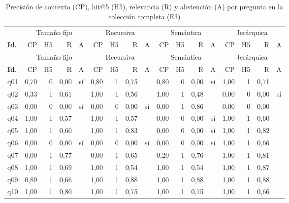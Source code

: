 \clearpage
\begin{scriptsize}
\setlength{\tabcolsep}{2.2pt}\renewcommand{\arraystretch}{0.92}
\begin{longtable}{@{}l rrrc rrrc rrrc rrrc@{}}
\caption[Precisión, hit@5, relevancia y abstención por pregunta (E3)]{Precisión de contexto (CP), hit@5 (H5), relevancia (R) y abstención (A) por pregunta en la colección completa (E3)}\label{tab:ap-e3-detalle}\\
\toprule
& \multicolumn{4}{c}{Tamaño fijo} & \multicolumn{4}{c}{Recursiva} & \multicolumn{4}{c}{Semántica} & \multicolumn{4}{c}{Jerárquica} \\
\cmidrule(lr){2-5}\cmidrule(lr){6-9}\cmidrule(lr){10-13}\cmidrule(lr){14-17}
\textbf{Id.} & CP & H5 & R & A & CP & H5 & R & A & CP & H5 & R & A & CP & H5 & R & A \\
\midrule
\endfirsthead
\toprule
& \multicolumn{4}{c}{Tamaño fijo} & \multicolumn{4}{c}{Recursiva} & \multicolumn{4}{c}{Semántica} & \multicolumn{4}{c}{Jerárquica} \\
\cmidrule(lr){2-5}\cmidrule(lr){6-9}\cmidrule(lr){10-13}\cmidrule(lr){14-17}
\textbf{Id.} & CP & H5 & R & A & CP & H5 & R & A & CP & H5 & R & A & CP & H5 & R & A \\
\midrule
\endhead
q01 & 0,70 & 0 & 0,00 & sí & 0,80 & 1 & 0,75 &  & 0,80 & 0 & 0,00 & sí & 1,00 & 1 & 0,71 &  \\
q02 & 0,33 & 1 & 0,61 &  & 1,00 & 1 & 0,56 &  & 1,00 & 1 & 0,48 &  & 0,00 & 0 & 0,00 & sí \\
q03 & 0,00 & 0 & 0,00 & sí & 0,00 & 0 & 0,00 & sí & 0,00 & 1 & 0,86 &  & 0,00 & 0 & 0,00 &  \\
q04 & 1,00 & 1 & 0,57 &  & 1,00 & 1 & 0,57 &  & 0,00 & 0 & 0,00 & sí & 1,00 & 1 & 0,60 &  \\
q05 & 1,00 & 1 & 0,60 &  & 1,00 & 1 & 0,83 &  & 0,00 & 0 & 0,00 & sí & 1,00 & 1 & 0,82 &  \\
q06 & 0,00 & 0 & 0,00 & sí & 0,00 & 0 & 0,00 & sí & 0,00 & 0 & 0,00 & sí & 1,00 & 1 & 0,66 &  \\
q07 & 0,00 & 1 & 0,77 &  & 0,00 & 1 & 0,65 &  & 0,20 & 1 & 0,76 &  & 1,00 & 1 & 0,81 &  \\
q08 & 1,00 & 1 & 0,69 &  & 1,00 & 1 & 0,54 &  & 1,00 & 1 & 0,54 &  & 1,00 & 1 & 0,87 &  \\
q09 & 0,89 & 1 & 0,66 &  & 1,00 & 1 & 0,88 &  & 1,00 & 1 & 0,88 &  & 1,00 & 1 & 0,88 &  \\
q10 & 1,00 & 1 & 0,80 &  & 1,00 & 1 & 0,75 &  & 1,00 & 1 & 0,75 &  & 1,00 & 1 & 0,66 &  \\

\end{longtable}
\end{scriptsize}
